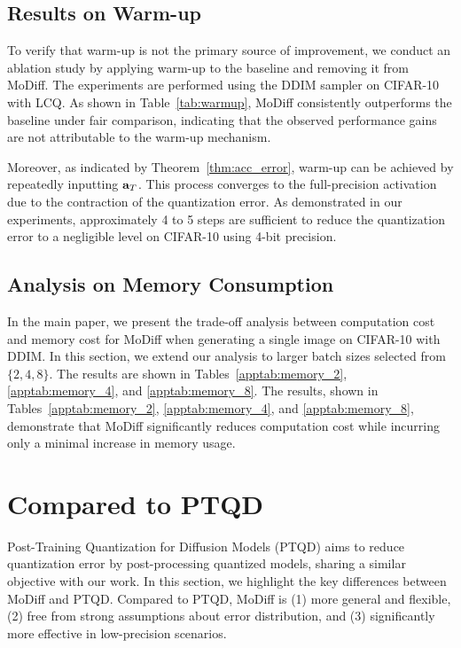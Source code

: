 

\subsection{Results on Warm-up}
\label{appsec:warmup}
To verify that warm-up is not the primary source of improvement, we conduct an ablation study by applying warm-up to the baseline and removing it from MoDiff. The experiments are performed using the DDIM sampler on CIFAR-10 with LCQ. As shown in Table~\ref{tab:warmup}, MoDiff consistently outperforms the baseline under fair comparison, indicating that the observed performance gains are not attributable to the warm-up mechanism.



Moreover, as indicated by Theorem~\ref{thm:acc_error}, warm-up can be achieved by repeatedly inputting ${\mathbf{a}}_T$. This process converges to the full-precision activation due to the contraction of the quantization error. As demonstrated in our experiments, approximately 4 to 5 steps are sufficient to reduce the quantization error to a negligible level on CIFAR-10 using 4-bit precision.

\subsection{Analysis on Memory Consumption}
\label{appsec:memory}
In the main paper, we present the trade-off analysis between computation cost and memory cost for MoDiff when generating a single image on CIFAR-10 with DDIM. In this section, we extend our analysis to larger batch sizes selected from  $\{2, 4, 8\}$. The results are shown in Tables~\ref{apptab:memory_2}, \ref{apptab:memory_4}, and \ref{apptab:memory_8}. The results, shown in Tables~\ref{apptab:memory_2}, \ref{apptab:memory_4}, and \ref{apptab:memory_8}, demonstrate that MoDiff significantly reduces computation cost while incurring only a minimal increase in memory usage.


\section{Compared to PTQD}
\label{appsec:ptqd}
Post-Training Quantization for Diffusion Models (PTQD) aims to reduce quantization error by post-processing quantized models, sharing a similar objective with our work. In this section, we highlight the key differences between MoDiff and PTQD. Compared to PTQD, MoDiff is (1) more general and flexible, (2) free from strong assumptions about error distribution, and (3) significantly more effective in low-precision scenarios.

